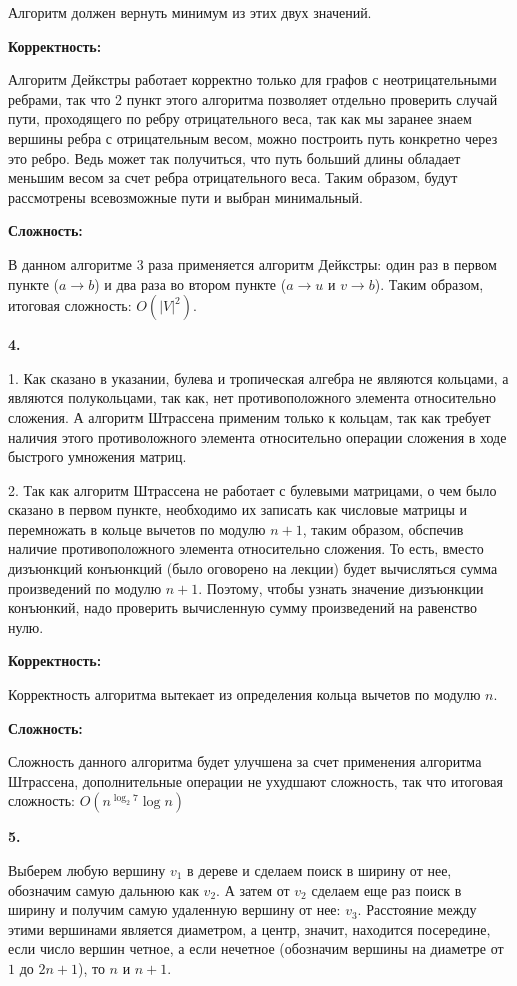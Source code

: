 \documentclass[12pt]{extreport}
\begin{document}
Алгоритм должен вернуть минимум из этих двух значений. 

\bigskip 
{\bf Корректность:}

Алгоритм Дейкстры работает корректно только для графов с неотрицательными ребрами, так что 2 пункт этого алгоритма позволяет отдельно проверить случай пути, проходящего по ребру отрицательного веса, так как мы заранее знаем вершины ребра с отрицательным весом, можно построить путь конкретно через это ребро. Ведь может так получиться, что путь больший длины обладает меньшим весом за счет ребра отрицательного веса. Таким образом, будут рассмотрены всевозможные пути и выбран минимальный. 

\bigskip 
{\bf Сложность:} 

В данном алгоритме 3 раза применяется алгоритм Дейкстры: один раз в первом пункте ($a \to b$) и два раза во втором пункте ($a \to u$ и $v \to b$). Таким образом, итоговая сложность: $O(|V|^2)$.

\bigskip 
{\bf 4.}

1. Как сказано в указании, булева и тропическая алгебра не являются кольцами, а являются полукольцами, так как, нет противоположного элемента относительно сложения. А алгоритм Штрассена применим только к кольцам, так как требует наличия этого противоложного элемента относительно операции сложения в ходе быстрого умножения матриц.

\bigskip 

2. Так как алгоритм Штрассена не работает с булевыми матрицами, о чем было сказано в первом пункте, необходимо их записать как числовые матрицы и перемножать в кольце вычетов по модулю $n+1$, таким образом, обспечив наличие противоположного элемента относительно сложения. То есть, вместо дизъюнкций конъюнкций (было оговорено на лекции) будет вычисляться сумма произведений по модулю $n+1$. Поэтому, чтобы узнать значение дизъюнкции конъюнкий, надо проверить вычисленную сумму произведений на равенство нулю.

\bigskip 
{\bf Корректность:}

Корректность алгоритма вытекает из определения кольца вычетов по модулю $n$.

\bigskip 
{\bf Сложность:}  

Сложность данного алгоритма будет улучшена за счет применения алгоритма Штрассена, дополнительные операции не ухудшают сложность, так что итоговая сложность: $O(n^{\log_{2} {7}} \log n)$

\bigskip 
{\bf 5.}

Выберем любую вершину $v_1 $ в дереве и сделаем поиск в ширину от нее, обозначим самую дальнюю как $v_2$. А затем от $v_2$  сделаем еще раз поиск в ширину и получим самую удаленную вершину от нее: $v_3$. Расстояние между этими вершинами является диаметром, а центр, значит, находится посередине, если число вершин четное, а если нечетное (обозначим вершины на диаметре от $1$ до $2n+1$), то $n$ и $n+1$.
\end{document}
